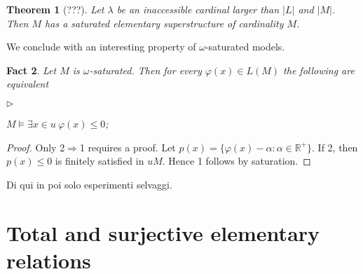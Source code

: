 \documentclass[12pt,letterpaper,oneside,reqno]{amsart}
\newcommand{\mylabel}[1]{{#1}\hfill}
\renewenvironment{itemize}
  {\begin{list}{$\triangleright$}{%
   \setlength{\parskip}{0mm}
   \setlength{\topsep}{.2\baselineskip}
   \setlength{\rightmargin}{0mm}
   \setlength{\listparindent}{0mm}
   \setlength{\itemindent}{0mm}
   \setlength{\labelwidth}{3ex}
   \setlength{\itemsep}{.2\baselineskip}
   \setlength{\parsep}{.2\baselineskip}
   \setlength{\partopsep}{0mm}
   \setlength{\labelsep}{1ex}
   \setlength{\leftmargin}{\labelwidth+\labelsep}
   \let\makelabel\mylabel}}{%
   \end{list}}
\theoremstyle{plain}
\newtheorem{theorem}{Theorem}%
\newtheorem{fact}[theorem]{Fact}
\theoremstyle{remark}
\renewcommand*{\emph}[1]{%
   \smash{\tikz[baseline]\node[rectangle, fill=olive!25, rounded corners, inner xsep=0.5ex, inner ysep=0.2ex, anchor=base, minimum height = 2.7ex]{#1};}}
\begin{document}
\begin{theorem}[???]
  Let $\lambda$ be an inaccessible cardinal larger than $|L|$ and $|M|$.
  Then $M$ has a saturated elementary superstructure of cardinality $M$. 
\end{theorem}

We conclude with an interesting property of $\omega$-saturated models.

\begin{fact}\label{fact_existential}
  Let $M$ is $\omega$-saturated.
  Then for every $\varphi(x)\in L(M)$ the following are equivalent
  \begin{itemize}
    \item[1.] $M\models\exists x\in u\ \varphi(x)\le0$;
    \item[2.] 
  \end{itemize}
\end{fact}
\begin{proof}
  Only 2$\Rightarrow$1 requires a proof.
  Let $p(x)=\{\varphi(x)-\alpha: \alpha\in{\mathds R}^+\}$.
  If 2, then $p(x)\le0$ is finitely satisfied in $uM$.
  Hence 1 follows by saturation.
\end{proof}

\hrulefill

Di qui in poi solo esperimenti selvaggi.









\section{Total and surjective elementary relations}
\end{document}
